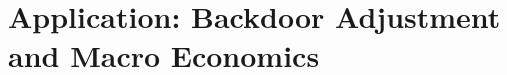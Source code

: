 \documentclass[12pt]{article}
\begin{document}





\section{Application: Backdoor Adjustment and Macro Economics}\label{real}
\end{document}
